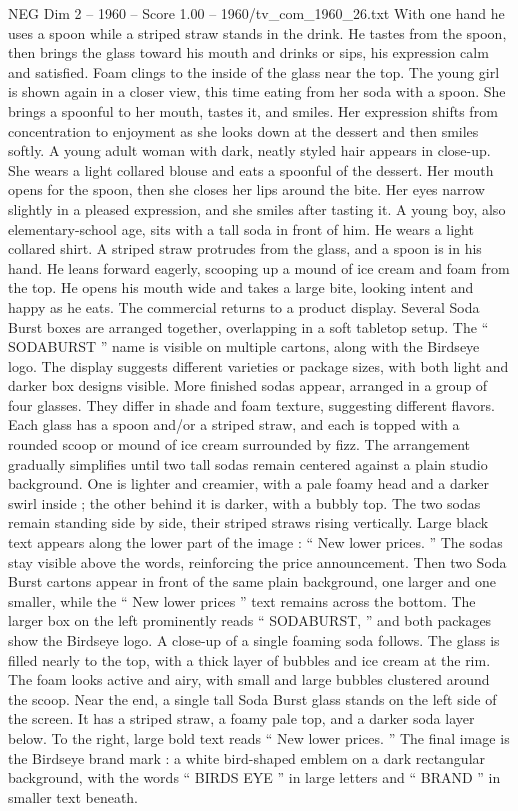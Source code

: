 \begin{textsample}{NEG Dim 2 – 1960 – Score 1.00 – 1960/tv\_com\_1960\_26.txt}
With one hand he uses a spoon while a striped straw stands in the drink.
He tastes from the spoon, then brings the glass toward his mouth and drinks or sips, his expression calm and satisfied.
Foam clings to the inside of the glass near the top.
The young girl is shown again in a closer view, this time eating from her soda with a spoon.
She brings a spoonful to her mouth, tastes it, and smiles.
Her expression shifts from concentration to enjoyment as she looks down at the dessert and then smiles softly.
A young adult woman with dark, neatly styled hair appears in close-up.
She wears a light collared blouse and eats a spoonful of the dessert.
Her mouth opens for the spoon, then she closes her lips around the bite.
Her eyes narrow slightly in a pleased expression, and she smiles after tasting it.
A young boy, also elementary-school age, sits with a tall soda in front of him.
He wears a light collared shirt.
A striped straw protrudes from the glass, and a spoon is in his hand.
He leans forward eagerly, scooping up a mound of ice cream and foam from the top.
He opens his mouth wide and takes a large bite, looking intent and happy as he eats.
The commercial returns to a product display.
Several Soda Burst boxes are arranged together, overlapping in a soft tabletop setup.
The “ SODABURST ” name is visible on multiple cartons, along with the Birdseye logo.
The display suggests different varieties or package sizes, with both light and darker box designs visible.
More finished sodas appear, arranged in a group of four glasses.
They differ in shade and foam texture, suggesting different flavors.
Each glass has a spoon and/or a striped straw, and each is topped with a rounded scoop or mound of ice cream surrounded by fizz.
The arrangement gradually simplifies until two tall sodas remain centered against a plain studio background.
One is lighter and creamier, with a pale foamy head and a darker swirl inside ; the other behind it is darker, with a bubbly top.
The two sodas remain standing side by side, their striped straws rising vertically.
Large black text appears along the lower part of the image : “ New lower prices. ” The sodas stay visible above the words, reinforcing the price announcement.
Then two Soda Burst cartons appear in front of the same plain background, one larger and one smaller, while the “ New lower prices ” text remains across the bottom.
The larger box on the left prominently reads “ SODABURST, ” and both packages show the Birdseye logo.
A close-up of a single foaming soda follows.
The glass is filled nearly to the top, with a thick layer of bubbles and ice cream at the rim.
The foam looks active and airy, with small and large bubbles clustered around the scoop.
Near the end, a single tall Soda Burst glass stands on the left side of the screen.
It has a striped straw, a foamy pale top, and a darker soda layer below.
To the right, large bold text reads “ New lower prices. ” The final image is the Birdseye brand mark : a white bird-shaped emblem on a dark rectangular background, with the words “ BIRDS EYE ” in large letters and “ BRAND ” in smaller text beneath.

\end{textsample}
